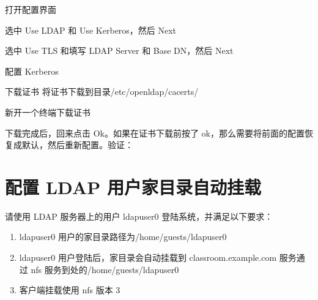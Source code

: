\documentclass[letterpaper,10pt,english]{sphinxmanual}
\begin{document}
打开配置界面

%
\begin{sphinxVerbatim}[commandchars=\\\{\}]
\end{sphinxVerbatim}

选中 Use LDAP 和 Use Kerberos，然后 Next

选中 Use TLS 和填写 LDAP Server 和 Base DN，然后 Next

配置 Kerberos

下载证书
将证书下载到目录/etc/openldap/cacerts/

新开一个终端下载证书

%
\begin{sphinxVerbatim}[commandchars=\\\{\}]
\PYG{p}{[} \PYG{p}{]}
\PYG{p}{[} \PYG{p}{]}
\end{sphinxVerbatim}

下载完成后，回来点击 Ok。如果在证书下载前按了 ok，那么需要将前面的配置恢复成默认，然后重新配置。验证：

%
\begin{sphinxVerbatim}[commandchars=\\\{\}]
\PYG{p}{[} \PYG{p}{]}
\end{sphinxVerbatim}


\section{配置 LDAP 用户家目录自动挂载}
\label{\detokenize{rhcsa/rhcsa_7:id7}}
请使用 LDAP 服务器上的用户 ldapuser0 登陆系统，并满足以下要求：
\begin{enumerate}
\item {} 
ldapuser0 用户的家目录路径为/home/guests/ldapuser0

\item {} 
ldapuser0 用户登陆后，家目录会自动挂载到 classroom.example.com 服务通过 nfs 服务到处的/home/guests/ldapuser0

\item {} 
客户端挂载使用 nfs 版本 3

\end{enumerate}
\end{document}
